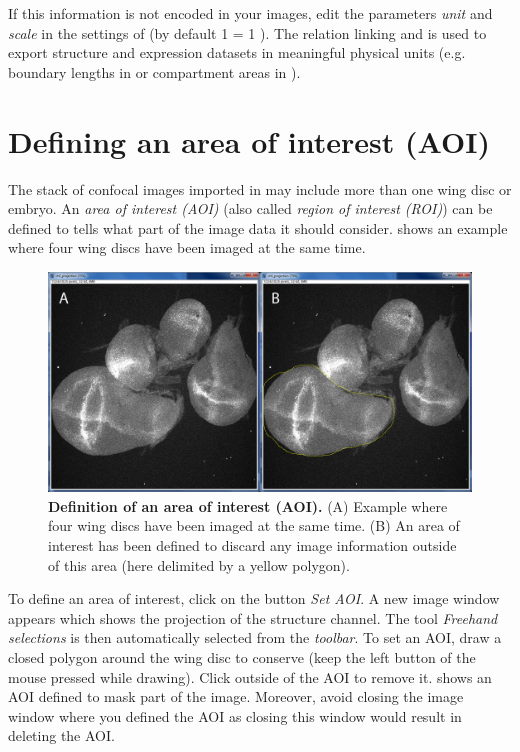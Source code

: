 If this information is not encoded in your images, edit the parameters \textit{unit} and \textit{scale} in the settings of \wingj (by default 1 \px = 1 \mum). The relation linking \px and \mum is used to export structure and expression datasets in meaningful physical units (e.g. boundary lengths in \mum or compartment areas in \mumsquare).

\section{Defining an area of interest (AOI)}\label{sec:aoi}
The stack of confocal images imported in \wingj may include more than one wing disc or embryo. An \textit{area of interest (AOI)} (also called \textit{region of interest (ROI)}) can be defined to tells \wingj what part of the image data it should consider.  shows an example where four wing discs have been imaged at the same time.\\

\begin{figure}[!h]
\centering
\includegraphics[scale=0.26]{images/aoi.jpg}
\caption{\textbf{Definition of an area of interest (AOI).} (A) Example where four wing discs have been imaged at the same time. (B) An area of interest has been defined to discard any image information outside of this area (here delimited by a yellow polygon).}
\label{fig:aoi}
\end{figure}

To define an area of interest, click on the button \textit{Set AOI}. A new image window appears which shows the projection of the structure channel. The \ij tool \textit{Freehand selections} is then automatically selected from the \textit{\ij toolbar}. To set an AOI, draw a closed polygon around the wing disc to conserve (keep the left button of the mouse pressed while drawing). Click outside of the AOI to remove it.  shows an AOI defined to mask part of the image.  Moreover, avoid closing the image window where you defined the AOI as closing this window would result in deleting the AOI.\\

